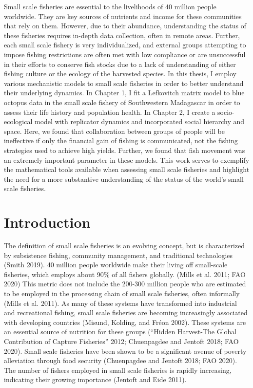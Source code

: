\documentclass[
]{article}
\begin{document}
Small scale fisheries are essential to the livelihoods of 40 million people worldwide. They are key sources of nutrients and income for these communities that rely on them. However, due to their abundance, understanding the status of these fisheries requires in-depth data collection, often in remote areas. Further, each small scale fishery is very individualized, and external groups attempting to impose fishing restrictions are often met with low compliance or are unsuccessful in their efforts to conserve fish stocks due to a lack of understanding of either fishing culture or the ecology of the harvested species. In this thesis, I employ various mechanistic models to small scale fisheries in order to better understand their underlying dynamics. In Chapter 1, I fit a Lefkovitch matrix model to blue octopus data in the small scale fishery of Southwestern Madagascar in order to assess their life history and population health. In Chapter 2, I create a socio-ecological model with replicator dynamics and incorporated social hierarchy and space. Here, we found that collaboration between groups of people will be ineffective if only the financial gain of fishing is communicated, not the fishing strategies used to achieve high yields. Further, we found that fish movement was an extremely important parameter in these models. This work serves to exemplify the mathematical tools available when assessing small scale fisheries and highlight the need for a more substantive understanding of the status of the world's small scale fisheries.

\newpage


\hypertarget{introduction}{%
\section{Introduction}\label{introduction}}

The definition of small scale fisheries is an evolving concept, but is characterized by subsistence fishing, community management, and traditional technologies (Smith 2019). 40 million people worldwide make their living off small-scale fisheries, which employs about 90\% of all fishers globally. (Mills et al. 2011; FAO 2020) This metric does not include the 200-300 million people who are estimated to be employed in the processing chain of small scale fisheries, often informally (Mills et al. 2011). As many of these systems have transformed into industrial and recreational fishing, small scale fisheries are becoming increasingly associated with developing countries (Misund, Kolding, and Fréon 2002). These systems are an essential source of nutrition for these groups ({``Hidden {Harvest}-{The} {Global} {Contribution} of {Capture} {Fisheries}''} 2012; Chuenpagdee and Jentoft 2018; FAO 2020). Small scale fisheries have been shown to be a significant avenue of poverty alleviation through food security (Chuenpagdee and Jentoft 2018; FAO 2020). The number of fishers employed in small scale fisheries is rapidly increasing, indicating their growing importance (Jentoft and Eide 2011).
\end{document}
